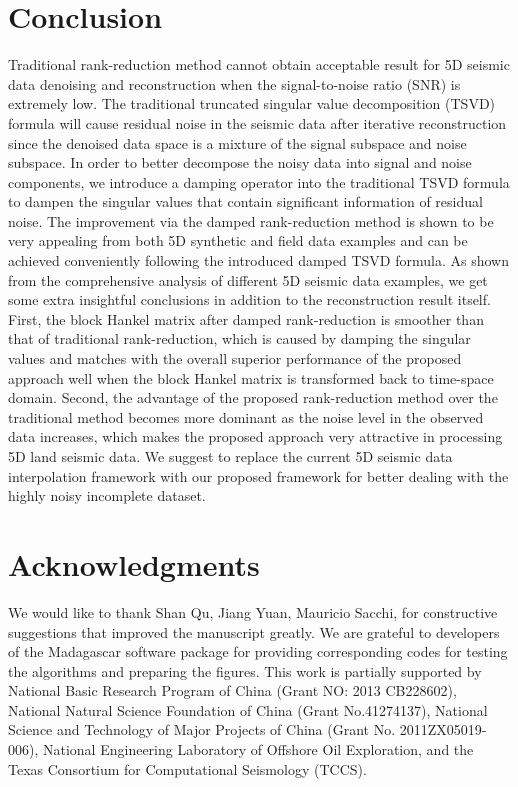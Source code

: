 \section{Conclusion}
Traditional rank-reduction method cannot obtain acceptable result for 5D seismic data denoising and reconstruction when the signal-to-noise ratio (SNR) is extremely low. The traditional truncated singular value decomposition (TSVD) formula will cause residual noise in the seismic data after iterative reconstruction since the denoised data space is a mixture of the signal subspace and noise subspace. In order to better decompose the noisy data into signal and noise components, we introduce a damping operator into the traditional TSVD formula to dampen the singular values that contain significant information of residual noise.   %
The improvement via the damped rank-reduction method is shown to be very appealing from both 5D synthetic and field data examples and can be achieved conveniently following the introduced damped TSVD formula. As shown from the comprehensive analysis of different 5D seismic data examples, we get some extra insightful conclusions in addition to the reconstruction result itself. First, the block Hankel matrix after damped rank-reduction is smoother than that of traditional rank-reduction, which is caused by damping the singular values and matches with the overall superior performance of the proposed approach well when the block Hankel matrix is transformed back to time-space domain. Second, the advantage of the proposed rank-reduction method over the traditional method becomes more dominant as the noise level in the observed data increases, which makes the proposed approach very attractive in processing 5D land seismic data.  We suggest to replace the current 5D seismic data interpolation framework with our proposed framework for better dealing with the highly noisy incomplete dataset.


\section{Acknowledgments}
We would like to thank Shan Qu, Jiang Yuan, Mauricio Sacchi,  for constructive suggestions that improved the manuscript greatly. We are grateful to developers of the Madagascar software package for providing corresponding codes for testing the algorithms and preparing the figures. This work is partially supported by National Basic Research Program of China (Grant NO: 2013 CB228602), National Natural Science Foundation of China (Grant No.41274137), National Science and Technology of Major Projects of China (Grant No. 2011ZX05019-006), National Engineering Laboratory of Offshore Oil Exploration, and the Texas Consortium for Computational Seismology (TCCS).
 
